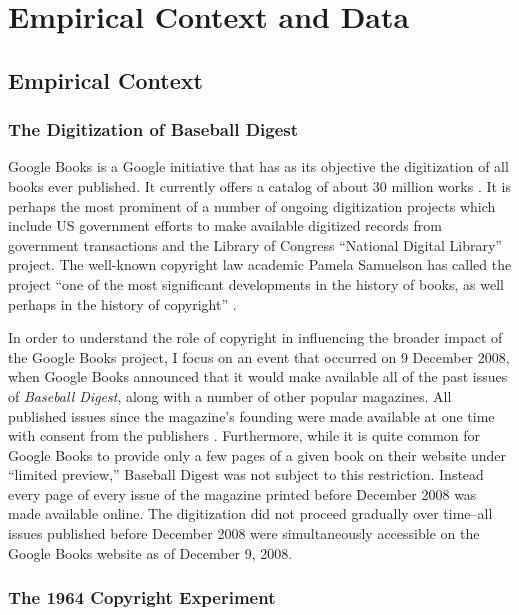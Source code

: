 \documentclass[11pt]{article}
\begin{document}
\section{Empirical Context and Data}
\label{sec:setting}

\subsection{Empirical Context}

\subsubsection{The Digitization of Baseball Digest}

Google Books is a Google initiative that has as its objective the digitization of all books ever published. It currently offers a catalog of about 30 million works \citep{wu_what_2015}. It is perhaps the most prominent of a number of ongoing digitization projects which include US government efforts to make available digitized records from government transactions and the Library of Congress ``National Digital Library'' project. The well-known copyright law academic Pamela Samuelson has called the project ``one of the most significant developments in the history of books, as well perhaps in the history of copyright'' \citep{samuelson_google_2009}. 

In order to understand the role of copyright in influencing the broader impact of the Google Books project, I focus on an event that occurred on 9 December 2008, when Google Books announced that it would make available all of the past issues of \emph{Baseball Digest}, along with a number of other popular magazines. All published issues since the magazine's founding were made available at one time with consent from the publishers \citep{foulser_search_2008}. Furthermore, while it is quite common for Google Books to provide only a few pages of a given book on their website under ``limited preview,'' Baseball Digest was not subject to this restriction. Instead every page of every issue of the magazine printed before December 2008 was made available online. The digitization did not proceed gradually over time--all issues published before December 2008 were simultaneously accessible on the Google Books website as of December 9, 2008. 

\subsubsection{The 1964 Copyright Experiment}
\end{document}
